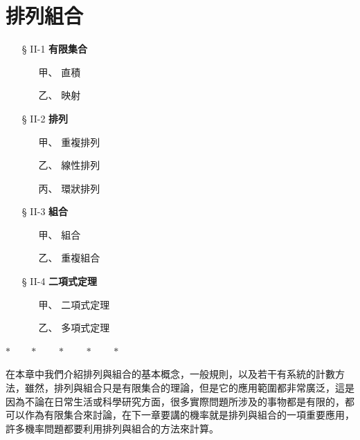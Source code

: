 \section{排列組合}\label{sec:b5s-ch2}

\begin{center}
\begin{minipage}{0.75\textwidth}
\begin{itemize}[leftmargin=2em, itemsep=0.3em]
  \item[§ II-1] \textbf{有限集合}
  \begin{itemize}[leftmargin=2em, itemsep=0.2em]
    \item[甲、] 直\quad 積
    \item[乙、] 映\quad 射
  \end{itemize}
  \item[§ II-2] \textbf{排\quad 列}
  \begin{itemize}[leftmargin=2em, itemsep=0.2em]
    \item[甲、] 重複排列
    \item[乙、] 線性排列
    \item[丙、] 環狀排列
  \end{itemize}
  \item[§ II-3] \textbf{組\quad 合}
  \begin{itemize}[leftmargin=2em, itemsep=0.2em]
    \item[甲、] 組\quad 合
    \item[乙、] 重複組合
  \end{itemize}
  \item[§ II-4] \textbf{二項式定理}
  \begin{itemize}[leftmargin=2em, itemsep=0.2em]
    \item[甲、] 二項式定理
    \item[乙、] 多項式定理
  \end{itemize}
\end{itemize}
\end{minipage}
\end{center}

\begin{center}
$* \qquad * \qquad * \qquad * \qquad *$
\end{center}

在本章中我們介紹排列與組合的基本概念，一般規則，以及若干有系統的計數方法，雖然，排列與組合只是有限集合的理論，但是它的應用範圍都非常廣泛，這是因為不論在日常生活或科學研究方面，很多實際問題所涉及的事物都是有限的，都可以作為有限集合來討論，在下一章要講的機率就是排列與組合的一項重要應用，許多機率問題都要利用排列與組合的方法來計算。

